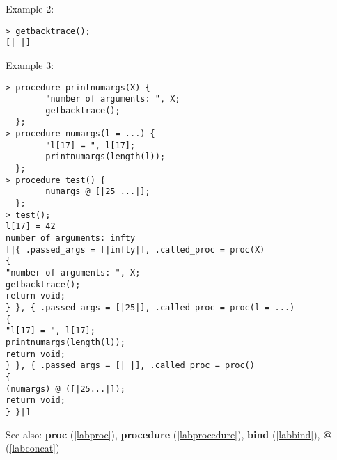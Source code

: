 \noindent Example 2: 
\begin{center}\begin{minipage}{15cm}\begin{Verbatim}[frame=single]
> getbacktrace();
[| |]
\end{Verbatim}
\end{minipage}\end{center}
\noindent Example 3: 
\begin{center}\begin{minipage}{15cm}\begin{Verbatim}[frame=single]
> procedure printnumargs(X) {
        "number of arguments: ", X;
        getbacktrace();
  };
> procedure numargs(l = ...) {
        "l[17] = ", l[17];
        printnumargs(length(l));
  };
> procedure test() {
        numargs @ [|25 ...|];
  };
> test();
l[17] = 42
number of arguments: infty
[|{ .passed_args = [|infty|], .called_proc = proc(X)
{
"number of arguments: ", X;
getbacktrace();
return void;
} }, { .passed_args = [|25|], .called_proc = proc(l = ...)
{
"l[17] = ", l[17];
printnumargs(length(l));
return void;
} }, { .passed_args = [| |], .called_proc = proc()
{
(numargs) @ ([|25...|]);
return void;
} }|]
\end{Verbatim}
\end{minipage}\end{center}
See also: \textbf{proc} (\ref{labproc}), \textbf{procedure} (\ref{labprocedure}), \textbf{bind} (\ref{labbind}), \textbf{@} (\ref{labconcat})
